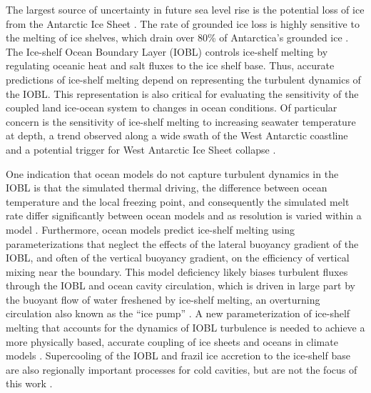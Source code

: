 \documentclass[tc, manuscript]{copernicus}
\begin{document}
The largest source of uncertainty in future sea level rise is the potential loss of ice from the Antarctic Ice Sheet \citep{ipcc_climate_2014}. The rate of grounded ice loss is highly sensitive to the melting of ice shelves, which drain over 80\% of Antarctica’s grounded ice \citep{reese_far_2018, rignot_ice-shelf_2013}. The Ice-shelf Ocean Boundary Layer (IOBL) controls ice-shelf melting by regulating oceanic heat and salt fluxes to the ice shelf base. Thus, accurate predictions of ice-shelf melting depend on representing the turbulent dynamics of the IOBL. This representation is also critical for evaluating the sensitivity of the coupled land ice-ocean system to changes in ocean conditions. Of particular concern is the sensitivity of ice-shelf melting to increasing seawater temperature at depth, a trend observed along a wide swath of the West Antarctic coastline and a potential trigger for West Antarctic Ice Sheet collapse \citep{purkey_unabated_2018, ruan_ice-shelf_2021, schmidtko_multidecadal_2014, wahlin_pathways_2021}. 

One indication that ocean models do not capture turbulent dynamics in the IOBL is that the simulated thermal driving, the difference between ocean temperature and the local freezing point, and consequently the simulated melt rate differ significantly between ocean models and as resolution is varied within a model \citep{gwyther_cold_2020}. Furthermore, ocean models predict ice-shelf melting using parameterizations that neglect the effects of the lateral buoyancy gradient of the IOBL, and often of the vertical buoyancy gradient, on the efficiency of vertical mixing near the boundary. This model deficiency likely biases turbulent fluxes through the IOBL and ocean cavity circulation, which is driven in large part by the buoyant flow of water freshened by ice-shelf melting, an overturning circulation also known as the ``ice pump'' \citep{webber_impact_2018}. A new parameterization of ice-shelf melting that accounts for the dynamics of IOBL turbulence is needed to achieve a more physically based, accurate coupling of ice sheets and oceans in climate models \citep{dinniman_modeling_2016, edwards_projected_2021, gwyther_cold_2020, naughten_future_2018}. Supercooling of the IOBL and frazil ice accretion to the ice-shelf base are also regionally important processes for cold cavities, but are not the focus of this work \citep{galton-fenzi_modeling_2012, jordan_conditional_2015}.
\end{document}
